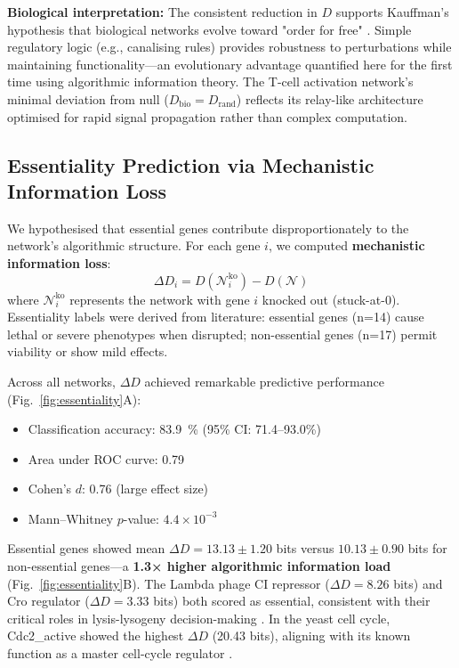 \documentclass[12pt]{article}
\begin{document}
\textbf{Biological interpretation:} The consistent reduction in \(D\) supports Kauffman's hypothesis that biological networks evolve toward "order for free" \cite{Kauffman1993}. Simple regulatory logic (e.g., canalising rules) provides robustness to perturbations while maintaining functionality—an evolutionary advantage quantified here for the first time using algorithmic information theory. The T-cell activation network's minimal deviation from null (\(D_{\mathrm{bio}} = D_{\mathrm{rand}}\)) reflects its relay-like architecture optimised for rapid signal propagation rather than complex computation.

\subsection{Essentiality Prediction via Mechanistic Information Loss}

We hypothesised that essential genes contribute disproportionately to the network's algorithmic structure. For each gene \(i\), we computed \textbf{mechanistic information loss}:
\begin{equation}
\Delta D_i = D(\mathcal{N}_i^{\mathrm{ko}}) - D(\mathcal{N})
\label{eq:deltaD}
\end{equation}
where \(\mathcal{N}_i^{\mathrm{ko}}\) represents the network with gene \(i\) knocked out (stuck-at-0). Essentiality labels were derived from literature: essential genes (n=14) cause lethal or severe phenotypes when disrupted; non-essential genes (n=17) permit viability or show mild effects.

Across all networks, \(\Delta D\) achieved remarkable predictive performance (Fig.~\ref{fig:essentiality}A):
\begin{itemize}
    \item Classification accuracy: \SI{83.9}{\percent} (95\% CI: 71.4–93.0\%) 
    \item Area under ROC curve: 0.79
    \item Cohen's \(d\): 0.76 (large effect size)
    \item Mann–Whitney \(p\)-value: \(4.4\times10^{-3}\)
\end{itemize}

Essential genes showed mean \(\Delta D = 13.13 \pm 1.20\) bits versus \(10.13 \pm 0.90\) bits for non-essential genes—a \textbf{1.3× higher algorithmic information load} (Fig.~\ref{fig:essentiality}B). The Lambda phage CI repressor (\(\Delta D = 8.26\) bits) and Cro regulator (\(\Delta D = 3.33\) bits) both scored as essential, consistent with their critical roles in lysis-lysogeny decision-making \cite{Gardner2000}. In the yeast cell cycle, Cdc2\_active showed the highest \(\Delta D\) (20.43 bits), aligning with its known function as a master cell-cycle regulator \cite{Davidich2008}.
\end{document}
